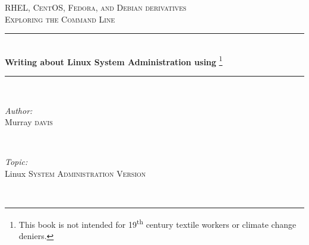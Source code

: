 \begin{titlepage}

\newcommand{\HRule}{\rule{\linewidth}{0.5mm}} %

\center %
 
%
\textsc{\Large RHEL, CentOS, Fedora, and Debian derivatives}\\[1.0cm] %
\textsc{\large Exploring the Command Line}\\[0.5cm] %


\HRule \\[0.4cm]
{ \Large \bfseries Writing about Linux System Administration using \latex}\footnote{This book is not intended for 19\textsuperscript{th} century textile workers or climate change deniers.}\\[0.4cm] %
\HRule \\[1.5cm]
 
%
%
\begin{minipage}{0.4\textwidth} %
\begin{flushleft} \large
\emph{Author:}\\ %
Murray \textsc{davis} %
\end{flushleft}
\end{minipage}
~
\begin{minipage}{0.4\textwidth}
\begin{flushright} \large
\emph{Topic:} \\
Linux \textsc{System Administration Version \versionnumber} 
\end{flushright}
\end{minipage}\\[4cm]


\end{titlepage}
